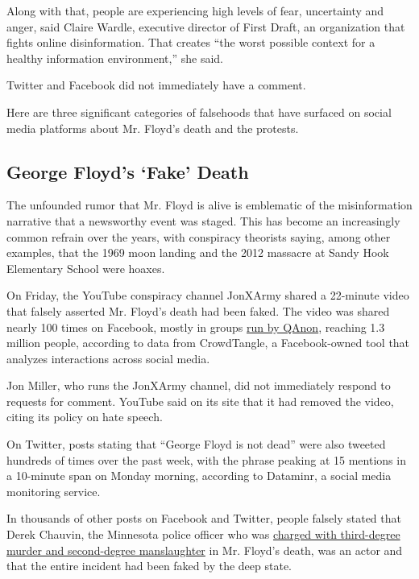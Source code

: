 Along with that, people are experiencing high levels of fear,
uncertainty and anger, said Claire Wardle, executive director of First
Draft, an organization that fights online disinformation. That creates
``the worst possible context for a healthy information environment,''
she said.

Twitter and Facebook did not immediately have a comment.

Here are three significant categories of falsehoods that have surfaced
on social media platforms about Mr. Floyd's death and the protests.

\hypertarget{george-floyds-fake-death}{%
\subsection{George Floyd's `Fake'
Death}\label{george-floyds-fake-death}}

The unfounded rumor that Mr. Floyd is alive is emblematic of the
misinformation narrative that a newsworthy event was staged. This has
become an increasingly common refrain over the years, with conspiracy
theorists saying, among other examples, that the 1969 moon landing and
the 2012 massacre at Sandy Hook Elementary School were hoaxes.

On Friday, the YouTube conspiracy channel JonXArmy shared a 22-minute
video that falsely asserted Mr. Floyd's death had been faked. The video
was shared nearly 100 times on Facebook, mostly in groups
\href{https://www.nytimes3xbfgragh.onion/2020/02/09/us/politics/qanon-trump-conspiracy-theory.html}{run
by QAnon}, reaching 1.3 million people, according to data from
CrowdTangle, a Facebook-owned tool that analyzes interactions across
social media.

Jon Miller, who runs the JonXArmy channel, did not immediately respond
to requests for comment. YouTube said on its site that it had removed
the video, citing its policy on hate speech.

On Twitter, posts stating that ``George Floyd is not dead'' were also
tweeted hundreds of times over the past week, with the phrase peaking at
15 mentions in a 10-minute span on Monday morning, according to
Dataminr, a social media monitoring service.

In thousands of other posts on Facebook and Twitter, people falsely
stated that Derek Chauvin, the Minnesota police officer who was
\href{https://www.nytimes3xbfgragh.onion/2020/05/29/us/minneapolis-police-george-floyd.html}{charged
with third-degree murder and second-degree manslaughter} in Mr. Floyd's
death, was an actor and that the entire incident had been faked by the
deep state.

